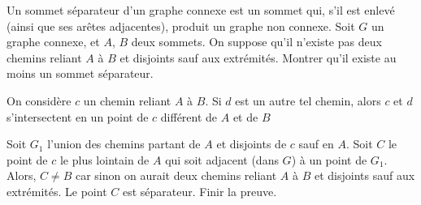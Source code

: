 \begin{exo} Un sommet séparateur d'un graphe connexe est un sommet qui, s'il est enlevé (ainsi que ses arêtes adjacentes), produit un graphe non connexe.
Soit $G$ un graphe connexe, et $A$, $B$ deux sommets. On suppose qu'il n'existe pas deux chemins reliant $A$ à $B$ et disjoints sauf aux extrémités. Montrer qu'il existe au moins un sommet séparateur.
\begin{sol}
On considère $c$ un chemin reliant $A$ à $B$. Si $d$ est un autre tel chemin, alors $c$ et $d$ s'intersectent en un point de $c$ différent de $A$ et de $B$

Soit $G_1$ l'union des chemins partant de $A$ et disjoints de $c$ sauf en $A$. Soit $C$ le point de $c$ le plus lointain de $A$ qui soit adjacent (dans $G$) à un point de $G_1$. Alors, $C\neq B$ car sinon on aurait deux chemins reliant $A$ à $B$ et disjoints sauf aux extrémités. Le point $C$ est séparateur. Finir la preuve.
\end{sol}
\end{exo}





